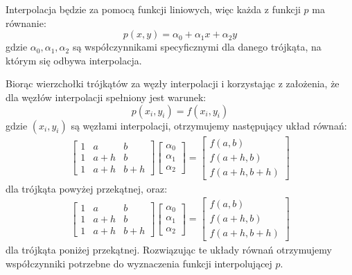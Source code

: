 \documentclass[12pt]{article}
\begin{document}
	Interpolacja będzie za pomocą funkcji liniowych, więc każda z funkcji $p$ ma równanie:
	$$p(x, y) = \alpha_0 + \alpha_1 x + \alpha_2 y$$
	gdzie $\alpha_0, \alpha_1, \alpha_2$ są współczynnikami specyficznymi dla danego trójkąta, na którym się odbywa interpolacja.
	
	Biorąc wierzchołki trójkątów za węzły interpolacji i korzystając z założenia, że dla węzłów interpolacji spełniony jest warunek:
	$$p(x_i, y_i) = f(x_i, y_i)$$
	gdzie $(x_i, y_i)$ są węzłami interpolacji, otrzymujemy następujący układ równań:
	\begin{align*}
		\left[
			\begin{array}{ccc}
				1 &  a  &  b  \\
				1 & a+h &  b  \\
				1 & a+h & b+h
			\end{array}
		\right]
		\left[
			\begin{array}{c}
				\alpha_0 \\
				\alpha_1 \\
				\alpha_2
			\end{array}
		\right]
		=		
		\left[
			\begin{array}{c}
				  f(a, b)   \\
				 f(a+h, b)  \\
				f(a+h, b+h)
			\end{array}
		\right]
	\end{align*}
	dla trójkąta powyżej przekątnej, oraz:
	\begin{align*}
		\left[
			\begin{array}{ccc}
				1 &  a  &  b  \\
				1 & a+h &  b  \\
				1 & a+h & b+h
			\end{array}
		\right]
		\left[
			\begin{array}{c}
				\alpha_0 \\
				\alpha_1 \\
				\alpha_2
			\end{array}
		\right]
		=		
		\left[
			\begin{array}{c}
				  f(a, b)   \\
				 f(a+h, b)  \\
				f(a+h, b+h)
			\end{array}
		\right]
	\end{align*}
	dla trójkąta poniżej przekątnej. Rozwiązując te układy równań otrzymujemy współczynniki potrzebne do wyznaczenia funkcji interpolującej $p$.
	
\end{document}
